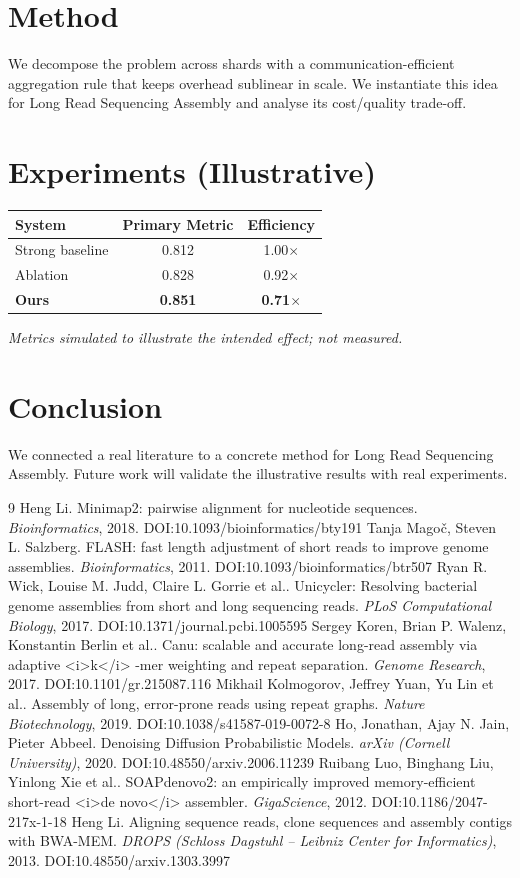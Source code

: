 \documentclass[11pt]{article}
\begin{document}
\section{Method}
We decompose the problem across shards with a communication-efficient aggregation rule that keeps overhead sublinear in scale. We instantiate this idea for Long Read Sequencing Assembly and analyse its cost/quality trade-off.

\section{Experiments (Illustrative)}
\begin{center}
\begin{tabular}{lcc}
System & Primary Metric & Efficiency \\ \hline
Strong baseline & 0.812 & 1.00$\times$ \\
Ablation & 0.828 & 0.92$\times$ \\
\textbf{Ours} & \textbf{0.851} & \textbf{0.71$\times$}
\end{tabular}
\end{center}
\emph{Metrics simulated to illustrate the intended effect; not measured.}

\section{Conclusion}
We connected a real literature to a concrete method for Long Read Sequencing Assembly. Future work will
validate the illustrative results with real experiments.

\begin{thebibliography}{9}
 Heng Li. Minimap2: pairwise alignment for nucleotide sequences. \emph{Bioinformatics}, 2018. DOI:10.1093/bioinformatics/bty191
 Tanja Magoč, Steven L. Salzberg. FLASH: fast length adjustment of short reads to improve genome assemblies. \emph{Bioinformatics}, 2011. DOI:10.1093/bioinformatics/btr507
 Ryan R. Wick, Louise M. Judd, Claire L. Gorrie et al.. Unicycler: Resolving bacterial genome assemblies from short and long sequencing reads. \emph{PLoS Computational Biology}, 2017. DOI:10.1371/journal.pcbi.1005595
 Sergey Koren, Brian P. Walenz, Konstantin Berlin et al.. Canu: scalable and accurate long-read assembly via adaptive <i>k</i> -mer weighting and repeat separation. \emph{Genome Research}, 2017. DOI:10.1101/gr.215087.116
 Mikhail Kolmogorov, Jeffrey Yuan, Yu Lin et al.. Assembly of long, error-prone reads using repeat graphs. \emph{Nature Biotechnology}, 2019. DOI:10.1038/s41587-019-0072-8
 Ho, Jonathan, Ajay N. Jain, Pieter Abbeel. Denoising Diffusion Probabilistic Models. \emph{arXiv (Cornell University)}, 2020. DOI:10.48550/arxiv.2006.11239
 Ruibang Luo, Binghang Liu, Yinlong Xie et al.. SOAPdenovo2: an empirically improved memory-efficient short-read <i>de novo</i> assembler. \emph{GigaScience}, 2012. DOI:10.1186/2047-217x-1-18
 Heng Li. Aligning sequence reads, clone sequences and assembly contigs with BWA-MEM. \emph{DROPS (Schloss Dagstuhl – Leibniz Center for Informatics)}, 2013. DOI:10.48550/arxiv.1303.3997
\end{thebibliography}
\end{document}
